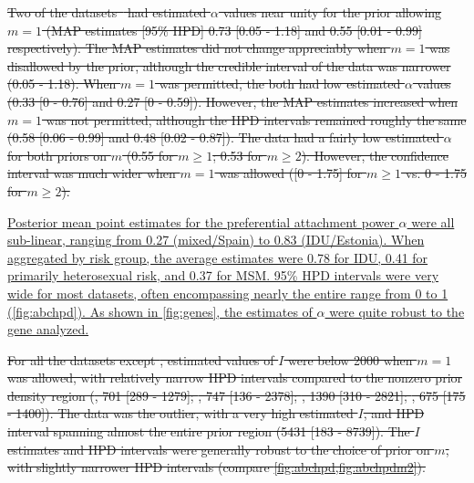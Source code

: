 \documentclass[12pt]{article}\usepackage[]{graphicx}\usepackage[]{color}
\let\mref\cref
\let\mciteauthor\citeauthor
\renewcommand{\cref}[1]{\mbox{\mref{#1}}}
\renewcommand{\citeauthor}[1]{\mbox{\mciteauthor{#1}}}
\newcommand{\add}[1]{\color{blue} \uline{#1} \color{black}}
\newcommand{\del}[1]{\color{red} \sout{#1} \color{black}}
\begin{document}
\del{Two of the datasets~\autocite{niculescu2015recent, wang2015targeting} had
estimated $\alpha$ values near unity for the prior allowing $m = 1$ (MAP
estimates [95\% HPD] 
  0.73 
  [0.05 - 
   1.18]
and
  0.55 
  [0.01 -
   0.99] respectively).
The MAP estimates did not change appreciably when $m = 1$ was disallowed by the
prior, although the credible interval of the \textcite{niculescu2015recent}
data was narrower
  (0.05 - 
   1.18).
When $m = 1$ was permitted, the \textcite{li2015hiv, cuevas2009hiv} both had
low estimated $\alpha$ values
  (0.33 
  [0 - 
  0.76]
and
  0.27 
  [0 -
   0.59]). 
However, the MAP estimates increased when $m = 1$ was not permitted, although
the HPD intervals remained roughly the same
  (0.58 
  [0.06 - 
  0.99]
and
  0.48 
  [0.02 -
   0.87]).
The \textcite{novitsky2014impact} data had a fairly low estimated $\alpha$
for both priors on $m$
  (0.55 for $m \geq 1$;
   0.53 for $m \geq 2$).
However, the confidence interval was much wider when $m = 1$ was allowed
  ([0 -
    1.75] for $m \geq 1$ vs.
    0 -
    1.75 for $m \geq 2$).}



\add{Posterior mean point estimates for the preferential attachment power $\alpha$
were all sub-linear, ranging from 
    0.27
(mixed/Spain) to
    0.83
(IDU/Estonia). When aggregated by risk group, the average estimates were
    0.78
for IDU,
    0.41
for primarily heterosexual risk, and
    0.37
for MSM. 95\% HPD intervals were very wide for most datasets, often
encompassing nearly the entire range from 0 to 1 (\cref{fig:abchpd}). As shown
in \cref{fig:genes}, the estimates of $\alpha$ were quite robust to the gene
analyzed.} 

\del{For all the datasets except \citeauthor{novitsky2014impact}, estimated values
of $I$ were below 2000 when $m = 1$ was allowed, with relatively narrow HPD
intervals compared to the nonzero prior density region
  (\citeauthor{cuevas2009hiv}, 701 
  [289 -
   1279];
   \citeauthor{niculescu2015recent}, 747
  [136 - 
   2378];
  \citeauthor{li2015hiv}, 1390 
  [310 -
   2821];
   \citeauthor{wang2015targeting}, 675
  [175 - 
   1400]).
The \citeauthor{novitsky2014impact} data was the outlier, with a very high
estimated $I$, and HPD interval spanning almost the entire prior region
  (5431 
  [183 -
   8739]).
The $I$ estimates and HPD intervals were generally robust to the choice of
prior on $m$, with slightly narrower HPD intervals (compare
\cref{fig:abchpd,fig:abchpdm2}).}
\end{document}
